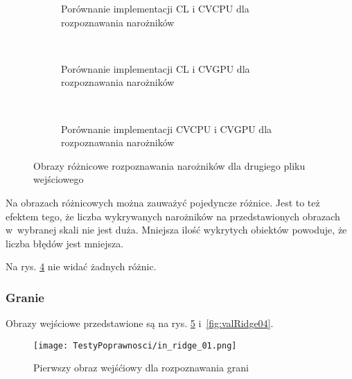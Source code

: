\begin{figure}
\begin{subfigure}[t]{0.3\textwidth}
	\centering
	\setlength\fboxsep{0pt}
	\setlength\fboxrule{0.5pt}
	\caption{Porównanie implementacji CL i CVCPU dla rozpoznawania narożników}
	\label{fig:valCorner2CLCVCPU}
\end{subfigure}
~
\begin{subfigure}[t]{0.3\textwidth}
	\centering
	\setlength\fboxsep{0pt}
	\setlength\fboxrule{0.5pt}
	\caption{Porównanie implementacji CL i CVGPU dla rozpoznawania narożników}
	\label{fig:valCorner2CLCVGPU}
\end{subfigure}
~
\begin{subfigure}[t]{0.3\textwidth}
	\centering
	\setlength\fboxsep{0pt}
	\setlength\fboxrule{0.5pt}
	\caption{Porównanie implementacji CVCPU i CVGPU dla rozpoznawania narożników}
	\label{fig:valCorner2CVCPUCVGPU}                 
\end{subfigure}
\caption{Obrazy różnicowe rozpoznawania narożników dla drugiego pliku wejściowego}
\label{lena_scales}
\label{fig:valCorner2}
\end{figure}

Na obrazach różnicowych można zauważyć pojedyncze różnice. Jest to też efektem tego, że liczba wykrywanych narożników na przedstawionych obrazach w~wybranej skali nie jest duża. Mniejsza ilość wykrytych obiektów powoduje, że liczba błędów jest mniejsza.

Na rys. \ref{fig:valCorner2} nie widać żadnych różnic.

\subsubsection{Granie}
\label{subsubsec:granieRysunki}

Obrazy wejściowe przedstawione są na rys. \ref{fig:valRidge01} i~\ref{fig:valRidge04}.

\begin{figure}
\begin{center}
\texttt{[image: TestyPoprawnosci/in\_ridge\_01.png]}
\end{center}
\caption{Pierwszy obraz wejśćiowy dla rozpoznawania grani}
\label{fig:valRidge01}
\end{figure}

